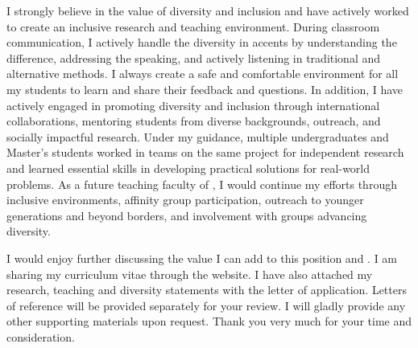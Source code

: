 \documentclass[11pt]{article}
\renewcommand*\paragraph[1]{}
\begin{document}
\paragraph{Diversity}
I strongly believe in the value of diversity and inclusion and have actively worked to create an inclusive research and teaching environment. During classroom communication, I actively handle the diversity in accents by understanding the difference, addressing the speaking, and actively listening in traditional and alternative methods.
I always create a safe and comfortable environment for all my students to learn and share their feedback and questions. In addition, I have actively engaged in promoting diversity and inclusion through international collaborations, mentoring students from diverse backgrounds, outreach, and socially impactful research. Under my guidance, multiple undergraduates and Master's students worked in teams on the same project for independent research and learned essential skills in developing practical solutions for real-world problems. As a future teaching faculty of \shortInstitutionName{}, I would continue my efforts through inclusive environments, affinity group participation, outreach to younger generations and beyond borders, and involvement with groups advancing diversity. 

\paragraph{P3) Relevant industrial experience beneficial to CS/ DS curriculum development and CS/DS capstone project advising}




I would enjoy further discussing the value I can add to this position and \InstitutionName{}. I am sharing my curriculum vitae
through the website. I have also attached my research, teaching and diversity 
statements with the letter of application. Letters of reference will be provided separately for your review. I will gladly provide any other supporting materials upon request. Thank you very much for your time and consideration.
\end{document}
